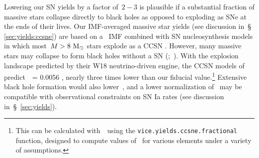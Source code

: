 \documentclass[ms.tex]{subfiles}
\begin{document}
\par
Lowering our SN yields by a factor of~$2 - 3$ is plausible if a substantial
fraction of massive stars collapse directly to black holes as opposed to
exploding as SNe at the ends of their lives.
Our IMF-averaged massive star yields (see discussion in~\S
\ref{sec:yields:ccsne}) are based on a~\citet{Kroupa2001} IMF combined with SN
nucleosynthesis models in which most~$M > 8~\text{M}_\odot$ stars explode as a CCSN
\cite[e.g.][]{Woosley1995, Chieffi2004, Chieffi2013, Limongi2018, Nomoto2013}.
However, many massive stars may collapse to form black holes without a SN
(\citealp*{Pejcha2015, Gerke2015};~\citealp{Sukhbold2016, Ertl2016, Adams2017,
Basinger2021}).
With the explosion landscape predicted by their W18 neutrino-driven engine, the
CCSN models of~\citet{Sukhbold2016} predict~~= 0.0056
\citep{Griffith2021a}, nearly three times lower than our fiducial
value.\footnote{
	This can be calculated with~\vice~using the
	\texttt{vice.yields.ccsne.fractional} function, designed to compute values
	of~ for various elements under a variety of assumptions.
}
Extensive black hole formation would also lower~, and a lower
normalization of~ may be compatible with observational constraints on
SN Ia rates (see discussion in~\S~\ref{sec:yields}).
\end{document}
